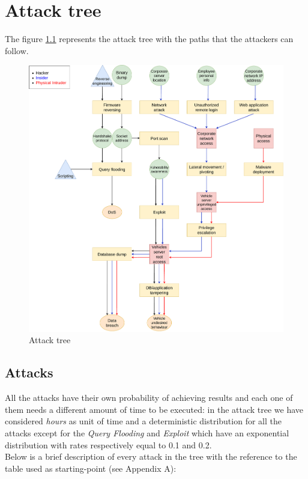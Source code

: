 %
\chapter{Attack tree}\label{ch:attackTree}

\noindent The figure \ref{fig:attackTree} represents the attack tree with the paths that the attackers can follow.

\begin{figure}[H]
    \begin{center}
        \includegraphics[scale=0.3]{img/attackTree.pdf}
        \caption{Attack tree}
        \label{fig:attackTree}
    \end{center}
    \vspace*{-0.4cm}
\end{figure}

\section{Attacks}
All the attacks have their own probability of achieving results and each one of them needs a different amount of time to be executed: in the attack tree we have considered \textit{hours} as unit of time and a deterministic distribution for all the attacks except for the \textit{Query Flooding} and \textit{Exploit} which have an exponential distribution with rates respectively equal to 0.1 and 0.2.\\
Below is a brief description of every attack in the tree with the reference to the table used as starting-point (see Appendix A):

